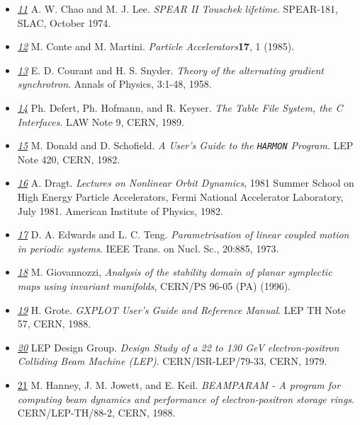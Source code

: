 \begin{itemize}
	\item \href{chao1}{\textit{11}} A. W. Chao and M. J. Lee. \textit{SPEAR II Touschek lifetime}. SPEAR-181, SLAC, October 1974. 


	\item \href{conte}{\textit{12}} M. Conte and M. Martini. \textit{Particle Accelerators}\textbf{17}, 1 (1985). 


	\item \href{courant}{\textit{13}} E. D. Courant and H. S. Snyder. \textit{Theory of the alternating gradient synchrotron}. Annals of Physics, 3:1-48, 1958. 


	\item \href{tfs}{\textit{14}} Ph. Defert, Ph. Hofmann, and R. Keyser. \textit{The Table File System, the C Interfaces}. LAW Note 9, CERN, 1989. 


	\item \href{donald}{\textit{15}} M. Donald and D. Schofield. \textit{A User's Guide to the \texttt{HARMON} Program}. LEP Note 420, CERN, 1982. 


	\item \href{dragt}{\textit{16}} A. Dragt. \textit{Lectures on Nonlinear Orbit Dynamics}, 1981 Summer School on High   Energy Particle Accelerators, Fermi National Accelerator Laboratory, July   1981. American Institute of Physics, 1982. 


	\item \href{edwards}{\textit{17}} D. A. Edwards and L. C. Teng. \textit{Parametrisation of linear coupled motion in periodic systems}. IEEE Trans. on Nucl. Sc., 20:885, 1973. 


	\item \href{giovanozzi}{\textit{18}} M. Giovannozzi, \textit{Analysis of the stability domain of planar symplectic maps using invariant manifolds}, CERN/PS 96-05 (PA) (1996). 


	\item \href{gxplot}{\textit{19}} H. Grote. \textit{GXPLOT User's Guide and Reference Manual}. LEP TH Note 57, CERN, 1988. 


	\item \href{lep}{\textit{20}} LEP Design Group. \textit{Design Study of a 22 to 130 GeV electron-positron Colliding Beam Machine   (LEP)}. CERN/ISR-LEP/79-33, CERN, 1979. 


	\item \href{beamparam<i}{21} M. Hanney, J. M. Jowett, and E. Keil. \textit{BEAMPARAM - A program for computing beam dynamics and   performance of electron-positron storage rings}. CERN/LEP-TH/88-2, CERN, 1988. 



\end{itemize}
